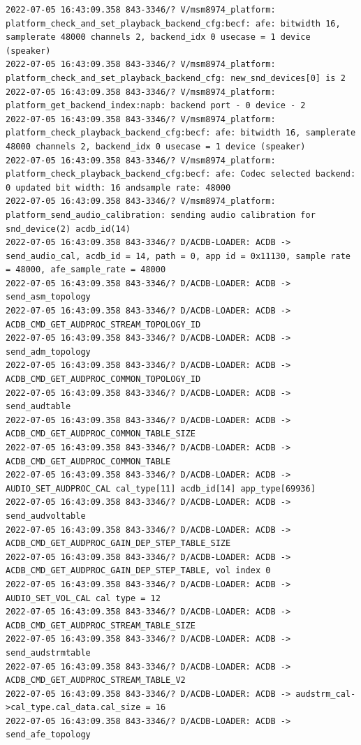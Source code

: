 \documentclass[a4paper,12pt]{book}
\begin{document}
\begin{lstlisting}
2022-07-05 16:43:09.358 843-3346/? V/msm8974_platform: platform_check_and_set_playback_backend_cfg:becf: afe: bitwidth 16, samplerate 48000 channels 2, backend_idx 0 usecase = 1 device (speaker)
2022-07-05 16:43:09.358 843-3346/? V/msm8974_platform: platform_check_and_set_playback_backend_cfg: new_snd_devices[0] is 2
2022-07-05 16:43:09.358 843-3346/? V/msm8974_platform: platform_get_backend_index:napb: backend port - 0 device - 2 
2022-07-05 16:43:09.358 843-3346/? V/msm8974_platform: platform_check_playback_backend_cfg:becf: afe: bitwidth 16, samplerate 48000 channels 2, backend_idx 0 usecase = 1 device (speaker)
2022-07-05 16:43:09.358 843-3346/? V/msm8974_platform: platform_check_playback_backend_cfg:becf: afe: Codec selected backend: 0 updated bit width: 16 andsample rate: 48000
2022-07-05 16:43:09.358 843-3346/? V/msm8974_platform: platform_send_audio_calibration: sending audio calibration for snd_device(2) acdb_id(14)
2022-07-05 16:43:09.358 843-3346/? D/ACDB-LOADER: ACDB -> send_audio_cal, acdb_id = 14, path = 0, app id = 0x11130, sample rate = 48000, afe_sample_rate = 48000
2022-07-05 16:43:09.358 843-3346/? D/ACDB-LOADER: ACDB -> send_asm_topology
2022-07-05 16:43:09.358 843-3346/? D/ACDB-LOADER: ACDB -> ACDB_CMD_GET_AUDPROC_STREAM_TOPOLOGY_ID
2022-07-05 16:43:09.358 843-3346/? D/ACDB-LOADER: ACDB -> send_adm_topology
2022-07-05 16:43:09.358 843-3346/? D/ACDB-LOADER: ACDB -> ACDB_CMD_GET_AUDPROC_COMMON_TOPOLOGY_ID
2022-07-05 16:43:09.358 843-3346/? D/ACDB-LOADER: ACDB -> send_audtable
2022-07-05 16:43:09.358 843-3346/? D/ACDB-LOADER: ACDB -> ACDB_CMD_GET_AUDPROC_COMMON_TABLE_SIZE
2022-07-05 16:43:09.358 843-3346/? D/ACDB-LOADER: ACDB -> ACDB_CMD_GET_AUDPROC_COMMON_TABLE
2022-07-05 16:43:09.358 843-3346/? D/ACDB-LOADER: ACDB -> AUDIO_SET_AUDPROC_CAL cal_type[11] acdb_id[14] app_type[69936]
2022-07-05 16:43:09.358 843-3346/? D/ACDB-LOADER: ACDB -> send_audvoltable
2022-07-05 16:43:09.358 843-3346/? D/ACDB-LOADER: ACDB -> ACDB_CMD_GET_AUDPROC_GAIN_DEP_STEP_TABLE_SIZE
2022-07-05 16:43:09.358 843-3346/? D/ACDB-LOADER: ACDB -> ACDB_CMD_GET_AUDPROC_GAIN_DEP_STEP_TABLE, vol index 0
2022-07-05 16:43:09.358 843-3346/? D/ACDB-LOADER: ACDB -> AUDIO_SET_VOL_CAL cal type = 12
2022-07-05 16:43:09.358 843-3346/? D/ACDB-LOADER: ACDB -> ACDB_CMD_GET_AUDPROC_STREAM_TABLE_SIZE
2022-07-05 16:43:09.358 843-3346/? D/ACDB-LOADER: ACDB -> send_audstrmtable
2022-07-05 16:43:09.358 843-3346/? D/ACDB-LOADER: ACDB -> ACDB_CMD_GET_AUDPROC_STREAM_TABLE_V2
2022-07-05 16:43:09.358 843-3346/? D/ACDB-LOADER: ACDB -> audstrm_cal->cal_type.cal_data.cal_size = 16
2022-07-05 16:43:09.358 843-3346/? D/ACDB-LOADER: ACDB -> send_afe_topology

\end{lstlisting}
\end{document}
